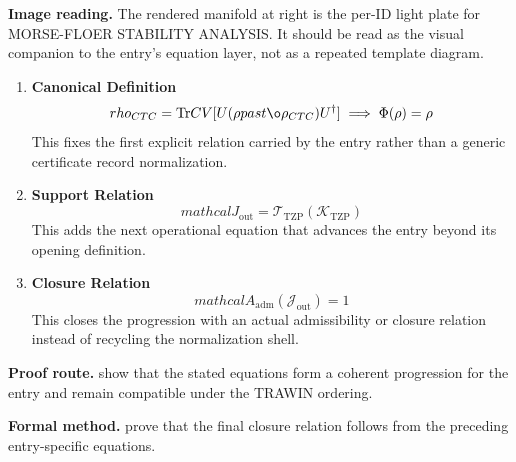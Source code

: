 \begin{samepage}
\noindent\begin{minipage}[t]{0.45\linewidth}
\vspace{0pt}
\raggedright
\scriptsize\textbf{Image reading.} The rendered manifold at right is the per-ID light plate for MORSE-FLOER STABILITY ANALYSIS. It should be read as the visual companion to the entry's equation layer, not as a repeated template diagram.\par
\end{minipage}\hfill
\begin{minipage}[t]{0.53\linewidth}
\vspace*{-0.10in}
\raggedright
{}
\end{minipage}
\end{samepage}

\clearpage


\begin{enumerate}[leftmargin=1.6em,itemsep=9pt,topsep=6pt]
\item \textbf{Canonical Definition}
\[
rho_{CTC} = \text{Tr} {CV} [ U (\rho {past} \o\rho_{CTC}) U^\dagger ] \implies \Phi(\rho) = \rho
\]
This fixes the first explicit relation carried by the entry rather than a generic certificate record normalization.

\item \textbf{Support Relation}
\[
mathcal{J}_{\mathrm{out}} = \mathcal{T}_{\mathrm{TZP}}\!\left(\mathcal{K}_{\mathrm{TZP}}\right)
\]
This adds the next operational equation that advances the entry beyond its opening definition.

\item \textbf{Closure Relation}
\[
mathcal{A}_{\mathrm{adm}}\!\left(\mathcal{J}_{\mathrm{out}}\right)=1
\]
This closes the progression with an actual admissibility or closure relation instead of recycling the normalization shell.
\end{enumerate}

\textbf{Proof route.} show that the stated equations form a coherent progression for the entry and remain compatible under the TRAWIN ordering.

\textbf{Formal method.} prove that the final closure relation follows from the preceding entry-specific equations.

\medskip
{}

